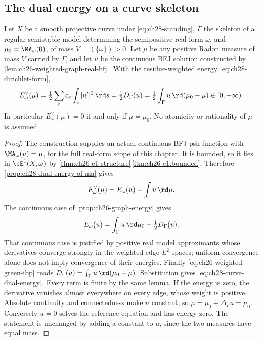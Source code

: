 \subsection{The dual energy on a curve skeleton}
\label{sec:ch28-curve-dual-energy}

\begin{proposition}
\label{prop:ch28-curve-dual-energy}
Let \(X\) be a smooth projective curve under \eqref{eq:ch28-standing},
\(\Gamma\) the skeleton of a regular semistable model determining the
semipositive real form \(\omega\), and \(\mu_0=\MA_\omega(0)\), of
mass \(V=(\{\omega\})>0\).  Let \(\mu\) be any positive Radon measure
of mass \(V\) carried by \(\Gamma\), and let \(u\) be the continuous
BFJ solution constructed by \cref{lem:ch26-weighted-graph-real-bfj}.
With the residue-weighted energy \eqref{eq:ch28-dirichlet-form},
\begin{equation}
\label{eq:ch28-curve-dual-energy}
 E^\vee_\omega(\mu)
 =\tfrac12\sum_e c_e\int_e|u'|^2\,\rd s
 =\tfrac12D_\Gamma(u)
 =\tfrac12\int_\Gamma u\,\rd(\mu_0-\mu)
 \in[0,+\infty).
\end{equation}
In particular \(E^\vee_\omega(\mu)=0\) if and only if \(\mu=\mu_0\).
No atomicity or rationality of \(\mu\) is assumed.
\end{proposition}

\begin{proof}
The construction supplies an actual continuous BFJ-psh function with
\(\MA_\omega(u)=\mu\), for the full real-form scope of this chapter.
It is bounded, so it lies in \(\cE^1(X,\omega)\) by
\cref{thm:ch26-e1-structure}\,\cref{itm:ch26-e1:bounded}.
Therefore \cref{prop:ch28-dual-energy-of-ma} gives
\[
 E^\vee_\omega(\mu)=E_\omega(u)-\int u\,\rd\mu.
\]
The continuous case of \cref{prop:ch26-graph-energy} gives
\[
 E_\omega(u)=\int_\Gamma u\,\rd\mu_0-\tfrac12D_\Gamma(u).
\]
That continuous case is justified by positive real model approximants
whose derivatives converge strongly in the weighted edge \(L^2\) spaces;
uniform convergence alone does not imply convergence of their energies.
Finally \eqref{eq:ch26-weighted-green-ibp} reads
\(D_\Gamma(u)=\int_\Gamma u\,\rd(\mu_0-\mu)\).
Substitution gives \eqref{eq:ch28-curve-dual-energy}.
Every term is finite by the same lemma.
If the energy is zero, the derivative vanishes almost everywhere on every
edge, whose weight is positive.  Absolute continuity and connectedness
make \(u\) constant, so \(\mu=\mu_0+\Delta_\Gamma u=\mu_0\).
Conversely \(u=0\) solves the reference equation and has energy zero.
The statement is unchanged by adding a constant to \(u\), since the
two measures have equal mass.
\end{proof}

